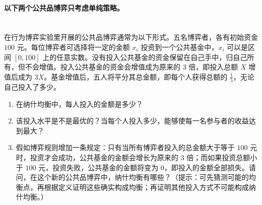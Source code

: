 \documentclass[12pt,a4paper]{article}
\begin{document}
\maketitle

\paragraph{以下两个公共品博弈只考虑单纯策略。}
\section{}
在行为博弈实验里开展的公共品博弈通常为以下形式。五名博弈者，各有初始资金 \(100\) 元。每位博弈者可选择将一定的金额 \(x_i\) 投资到一个公共基金中，\(x_i\) 可以是区间 \([0,100]\) 上的任意实数。没有投入公共基金的资金保留在自己手中，归自己所有，但不会增值。投入公共基金的资金会增值成为原来的 \(3\) 倍，即投入总额 \(X\) 增值后成为 \(3X\)。基金增值后，五人将平分其总金额，即每个人获得总额的 \(\frac{1}{5}\)，无论自己投入了多少。

\begin{enumerate}[label=\alph*.]
  \item 在纳什均衡中，每人投入的金额是多少？
  \item 该投入水平是不是最优的？当每个人投入多少，能够使每一名参与者的收益达到最大？
  \item 假如博弈规则增加一条规定：只有当所有博弈者投入的总金额大于等于 \(100\) 元时，投资才会成功，公共基金的金额会增长为原来的 \(3\) 倍；而如果投资总额小于 \(100\) 元，投资失败，公共基金的金额将变为 \(0\)，即投入的金额全部损失。请问，在这个新的公共品博弈中，纳什均衡有哪些？（提示：可先猜测可能的均衡点，再根据定义证明这些确实构成均衡；再证明其他投入方式不可能构成纳什均衡。）
\end{enumerate}

\vspace{0.5cm}
\end{document}
